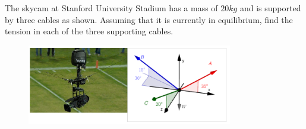 
The skycam at Stanford University Stadium has a mass of $20 kg$ and is supported by three cables as shown. Assuming that it is currently in equilibrium, find the tension in each of the three supporting cables.

\begin{figure}[ht!]
  \centering
  \includegraphics[width=0.8\textwidth,height=0.5\textheight,keepaspectratio]{fig.png}
\end{figure}




